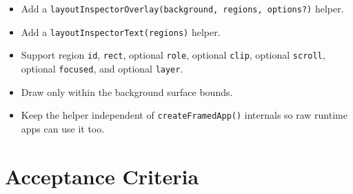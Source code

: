 \begin{itemize}
\tightlist
\item
  Add a \texttt{l\allowbreak{}a\allowbreak{}y\allowbreak{}o\allowbreak{}u\allowbreak{}t\allowbreak{}I\allowbreak{}n\allowbreak{}s\allowbreak{}p\allowbreak{}e\allowbreak{}c\allowbreak{}t\allowbreak{}o\allowbreak{}r\allowbreak{}O\allowbreak{}v\allowbreak{}e\allowbreak{}r\allowbreak{}l\allowbreak{}a\allowbreak{}y\allowbreak{}(\allowbreak{}b\allowbreak{}a\allowbreak{}c\allowbreak{}k\allowbreak{}g\allowbreak{}r\allowbreak{}o\allowbreak{}u\allowbreak{}n\allowbreak{}d\allowbreak{},\allowbreak{} \allowbreak{}r\allowbreak{}e\allowbreak{}g\allowbreak{}i\allowbreak{}o\allowbreak{}n\allowbreak{}s\allowbreak{},\allowbreak{} \allowbreak{}o\allowbreak{}p\allowbreak{}t\allowbreak{}i\allowbreak{}o\allowbreak{}n\allowbreak{}s\allowbreak{}?\allowbreak{})} helper.
\item
  Add a \texttt{l\allowbreak{}a\allowbreak{}y\allowbreak{}o\allowbreak{}u\allowbreak{}t\allowbreak{}I\allowbreak{}n\allowbreak{}s\allowbreak{}p\allowbreak{}e\allowbreak{}c\allowbreak{}t\allowbreak{}o\allowbreak{}r\allowbreak{}T\allowbreak{}e\allowbreak{}x\allowbreak{}t\allowbreak{}(\allowbreak{}r\allowbreak{}e\allowbreak{}g\allowbreak{}i\allowbreak{}o\allowbreak{}n\allowbreak{}s\allowbreak{})} helper.
\item
  Support region \texttt{i\allowbreak{}d}, \texttt{r\allowbreak{}e\allowbreak{}c\allowbreak{}t}, optional \texttt{r\allowbreak{}o\allowbreak{}l\allowbreak{}e}, optional \texttt{c\allowbreak{}l\allowbreak{}i\allowbreak{}p}, optional \texttt{s\allowbreak{}c\allowbreak{}r\allowbreak{}o\allowbreak{}l\allowbreak{}l}, optional \texttt{f\allowbreak{}o\allowbreak{}c\allowbreak{}u\allowbreak{}s\allowbreak{}e\allowbreak{}d}, and optional \texttt{l\allowbreak{}a\allowbreak{}y\allowbreak{}e\allowbreak{}r}.
\item
  Draw only within the background surface bounds.
\item
  Keep the helper independent of \texttt{c\allowbreak{}r\allowbreak{}e\allowbreak{}a\allowbreak{}t\allowbreak{}e\allowbreak{}F\allowbreak{}r\allowbreak{}a\allowbreak{}m\allowbreak{}e\allowbreak{}d\allowbreak{}A\allowbreak{}p\allowbreak{}p\allowbreak{}(\allowbreak{})} internals so raw runtime apps can use it too.
\end{itemize}

\section{Acceptance Criteria}\label{record-122-acceptance-criteria}


